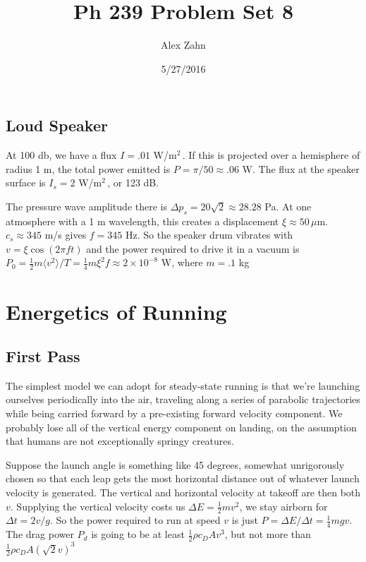 \documentclass[12pt]{article}
\title{Ph 239 Problem Set 8}
\author{Alex Zahn}
\date{5/27/2016}
\begin{document}
\maketitle

\newcommand{\wmsq}{W/\(\mathrm{m}^2\,\)}
\newcommand{\msq}{\(\mathrm{m}^2\,\)}
\newcommand{\micron}{\(\mu\mathrm{m}\)\,}
\newcommand{\mcb}{\(\mathrm{m}^3\,\)}
\newcommand{\msqr}{m\(^2\)}


\subsection{Loud Speaker}

At 100 db, we have a flux \(I = .01 \)  \wmsq. If this is projected over a hemisphere of radius 1 m, the total power emitted is \(P = \pi/50 \approx .06\) W. The flux at the speaker surface is \(I_s = 2\) \wmsq, or 123 dB.

The pressure wave amplitude there is \(\Delta p_s = 20\sqrt{2} \approx 28.28\) Pa. At one atmosphere with a 1 m wavelength, this creates a displacement \(\xi \approx 50 \, \mu\)m. \(c_s \approx 345\) m/s  gives \(f = 345\) Hz. So the speaker drum vibrates with \(v = \xi \cos(2\pi ft)\) and the power required to drive it in a vacuum is \(P_0 = \frac{1}{2}m \langle v^2 \rangle/T = \frac{1}{4}m\xi^2 f \approx 2 \times 10^{-8} \) W, where \(m = .1\) kg





\section{Energetics of Running}

\subsection{First Pass}

The simplest model we can adopt for steady-state running is that we're launching ourselves periodically into the air, traveling along a series of parabolic trajectories while being carried forward by a pre-existing forward velocity component. We probably lose all of the vertical energy component on landing, on the assumption that humans are not exceptionally springy creatures.

Suppose the launch angle is something like 45 degrees, somewhat unrigorously chosen so that each leap gets the most horizontal distance out of whatever launch velocity is generated. The vertical and horizontal velocity at takeoff are then both \(v\). Supplying the vertical velocity costs us \(\Delta E = \frac{1}{2}mv^2\), we stay airborn for \(\Delta t = 2v/g\). So the power required to run at speed \(v\) is just \(P = \Delta E / \Delta t=\frac{1}{4}mgv\). The drag power \(P_d\) is going to be at least \(\frac{1}{2}\rho c_D A v^3\), but not more than \(\frac{1}{2}\rho c_D A (\sqrt{2}v)^3\)
\end{document}
